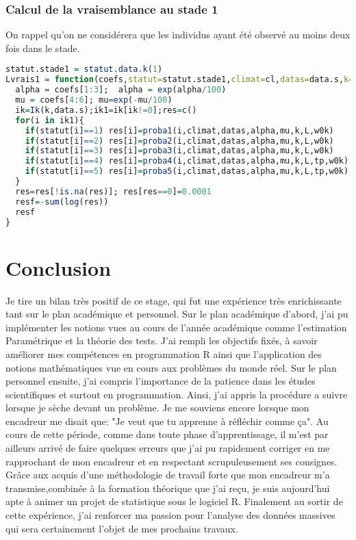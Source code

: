 \documentclass[12pt,a4paper]{scrbook}
\begin{document}
	\subsection{Calcul de la vraisemblance au stade 1}
	On rappel qu'on ne considérera que les individus ayant été observé au moins deux fois dans le stade.
	\begin{lstlisting}[language=R]
statut.stade1 = statut.data.k(1)
Lvrais1 = function(coefs,statut=statut.stade1,climat=cl,datas=data.s,k=1,L=7,tp=20,w0k=w0.1){
  alpha = coefs[1:3];  alpha = exp(alpha/100)
  mu = coefs[4:6]; mu=exp(-mu/100)
  ik=Ik(k,data.s);ik1=ik[ik!=0];res=c()
  for(i in ik1){
    if(statut[i]==1) res[i]=proba1(i,climat,datas,alpha,mu,k,L,w0k)
    if(statut[i]==2) res[i]=proba2(i,climat,datas,alpha,mu,k,L,w0k)
    if(statut[i]==3) res[i]=proba3(i,climat,datas,alpha,mu,k,L,w0k)
    if(statut[i]==4) res[i]=proba4(i,climat,datas,alpha,mu,k,L,tp,w0k)
    if(statut[i]==5) res[i]=proba5(i,climat,datas,alpha,mu,k,L,tp,w0k)
  }
  res=res[!is.na(res)]; res[res==0]=0.0001
  resf=-sum(log(res)) 
  resf
}
    \end{lstlisting}
	
	\chapter{Conclusion}	
	Je tire un bilan très positif de ce stage, qui fut une expérience très enrichissante tant sur le plan académique et personnel. Sur le plan académique d’abord, j’ai pu implémenter les notions vues au cours de l'année académique comme l'estimation Paramétrique et la théorie des tests. J’ai rempli les objectifs fixés, à savoir améliorer mes compétences en programmation R ainsi que l'application des notions mathématiques vue en cours aux problèmes du monde réel. Sur le plan personnel ensuite, j'ai compris l'importance de la patience dans les études scientifiques et surtout en programmation. Ainsi, j'ai appris la procédure a suivre lorsque je sèche devant un problème. Je me souviens encore lorsque mon  encadreur me disait que: "Je veut que tu apprenne à réfléchir comme ça". Au cours de cette période, comme dans toute phase d’apprentissage, il m’est par ailleurs arrivé de faire quelques erreurs que j’ai pu rapidement corriger en me rapprochant de mon encadreur et en respectant scrupuleusement ses consignes. Grâce aux acquis d’une méthodologie de travail forte que mon encadreur m’a transmise,combinée à la formation théorique que j’ai reçu, je suis aujourd’hui apte à animer un projet de statistique sous le logiciel R. Finalement au sortir de cette expérience, j'ai renforcer ma passion pour l'analyse des données massives qui sera certainement l'objet de mes prochains travaux.
	
\end{document}
